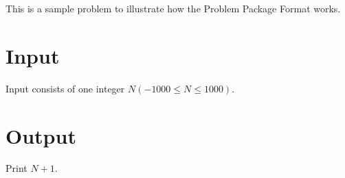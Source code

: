 This is a sample problem to illustrate how the Problem Package Format works.
\section*{Input}
Input consists of one integer $N (-1000 \le N \le 1000)$.
\section*{Output}
Print $N + 1$.
